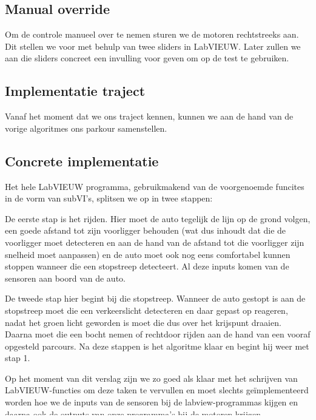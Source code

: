 \documentclass[12pt]{article}
\begin{document}
\subsection{Manual override}
Om de controle manueel over te nemen sturen we de motoren rechtstreeks aan. Dit stellen we voor met behulp van twee sliders in LabVIEUW. Later zullen we aan die sliders concreet een invulling voor geven om op de test te gebruiken.

\subsection{Implementatie traject}

Vanaf het moment dat we ons traject kennen, kunnen we aan de hand van de vorige algoritmes ons parkour samenstellen.

\subsection{Concrete implementatie}
Het hele LabVIEUW programma, gebruikmakend van de voorgenoemde funcites in de vorm van subVI's, splitsen we op in twee stappen:\bigskip

De eerste stap is het rijden. Hier moet de auto tegelijk de lijn op de grond volgen, een goede afstand tot zijn voorligger behouden (wat dus inhoudt dat die de voorligger moet detecteren en aan de hand van de afstand tot die voorligger zijn snelheid moet aanpassen) en de auto moet ook nog eens comfortabel kunnen stoppen wanneer die een stopstreep detecteert. Al deze inputs komen van de sensoren aan boord van de auto.\bigskip

De tweede stap hier begint bij die stopstreep. Wanneer de auto gestopt is aan de stopstreep moet die een verkeerslicht detecteren en daar gepast op reageren, nadat het groen licht geworden is moet die dus over het krijspunt draaien. Daarna moet die een bocht nemen of rechtdoor rijden aan de hand van een vooraf opgesteld parcours. Na deze stappen is het algoritme klaar en begint hij weer met stap 1.\bigskip

Op het moment van dit verslag zijn we zo goed als klaar met het schrijven van LabVIEUW-functies om deze taken te vervullen en moet slechts geïmplementeerd worden hoe we de inputs van de sensoren bij de labview-programmas kijgen en daarna ook de outputs van onze programma’s bij de motoren krijgen.
\end{document}
